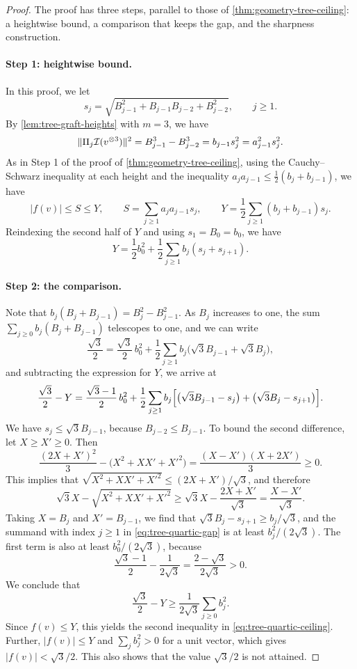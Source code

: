 \begin{proof}
The proof has three steps, parallel to those of \cref{thm:geometry-tree-ceiling}: a heightwise bound, a comparison that keeps the gap, and the sharpness construction.

\paragraph{Step 1: heightwise bound.}
In this proof, we let
\[
 s_j=\sqrt{B_{j-1}^2+B_{j-1}B_{j-2}+B_{j-2}^2},\qquad j\ge1.
\]
By \cref{lem:tree-graft-heights} with $m=3$, we have
\[
 \lVert\Pi_j\mathcal I(v^{\otimes3})\rVert^2=B_{j-1}^3-B_{j-2}^3=b_{j-1}s_j^2=a_{j-1}^2s_j^2.
\]
As in Step 1 of the proof of \cref{thm:geometry-tree-ceiling}, using the Cauchy--Schwarz inequality at each height and the inequality $a_ja_{j-1}\le\frac12(b_j+b_{j-1})$, we have
\[
 |f(v)|\le S\le Y,\qquad S=\sum_{j\ge1}a_ja_{j-1}s_j,\qquad Y=\frac12\sum_{j\ge1}(b_j+b_{j-1})s_j.
\]
Reindexing the second half of $Y$ and using $s_1=B_0=b_0$, we have
\[
 Y=\frac12b_0^2+\frac12\sum_{j\ge1}b_j(s_j+s_{j+1}).
\]

\paragraph{Step 2: the comparison.}
Note that $b_j(B_j+B_{j-1})=B_j^2-B_{j-1}^2$. As $B_j$ increases to one, the sum $\sum_{j\ge0}b_j(B_j+B_{j-1})$ telescopes to one, and we can write
\[
 \frac{\sqrt3}2=\frac{\sqrt3}2\,b_0^2+\frac12\sum_{j\ge1}b_j\bigl(\sqrt3B_{j-1}+\sqrt3B_j\bigr),
\]
and subtracting the expression for $Y$, we arrive at
\begin{equation}\label{eq:tree-quartic-gap}
 \frac{\sqrt3}2-Y=\frac{\sqrt3-1}2\,b_0^2
 +\frac12\sum_{j\ge1}b_j\Bigl[\bigl(\sqrt3B_{j-1}-s_j\bigr)+\bigl(\sqrt3B_j-s_{j+1}\bigr)\Bigr].
\end{equation}
We have $s_j\le\sqrt3B_{j-1}$, because $B_{j-2}\le B_{j-1}$. To bound the second difference, let $X\ge X'\ge0$. Then
\[
 \frac{(2X+X')^2}{3}-\bigl(X^2+XX'+X'^2\bigr)=\frac{(X-X')(X+2X')}{3}\ge0.
\]
This implies that $\sqrt{X^2+XX'+X'^2}\le(2X+X')/\sqrt3$, and therefore
\[
 \sqrt3X-\sqrt{X^2+XX'+X'^2}\ge\sqrt3X-\frac{2X+X'}{\sqrt3}=\frac{X-X'}{\sqrt3}.
\]
Taking $X=B_j$ and $X'=B_{j-1}$, we find that $\sqrt3B_j-s_{j+1}\ge b_j/\sqrt3$, and the summand with index $j\ge1$ in \eqref{eq:tree-quartic-gap} is at least $b_j^2/(2\sqrt3)$. The first term is also at least $b_0^2/(2\sqrt3)$, because
\[
 \frac{\sqrt3-1}2-\frac1{2\sqrt3}=\frac{2-\sqrt3}{2\sqrt3}>0.
\]
We conclude that
\[
 \frac{\sqrt3}2-Y\ge\frac1{2\sqrt3}\sum_{j\ge0}b_j^2.
\]
Since $f(v)\le Y$, this yields the second inequality in \eqref{eq:tree-quartic-ceiling}. Further, $|f(v)|\le Y$ and $\sum_jb_j^2>0$ for a unit vector, which gives $|f(v)|<\sqrt3/2$. This also shows that the value $\sqrt3/2$ is not attained.


\end{proof}
